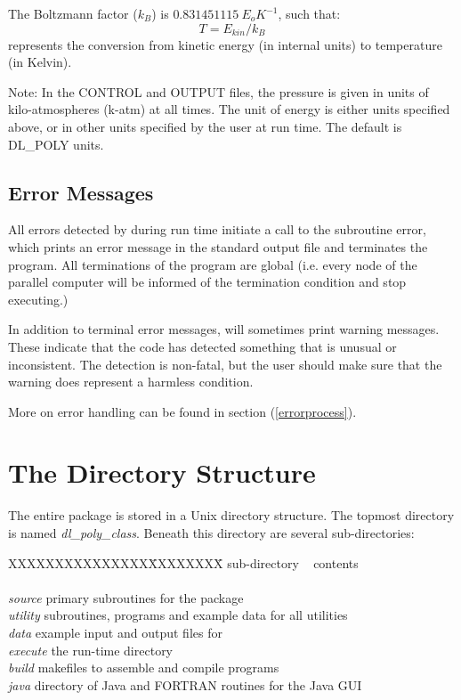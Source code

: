 \noindent The Boltzmann factor ($k_{B}$) is $0.831451115~E_{o}K^{-1}$,
such that:
\[T=E_{kin}/k_{B}\]
represents the conversion from kinetic energy (in internal units) to
temperature (in Kelvin).

Note: In the \D{} CONTROL and OUTPUT files, the
pressure is given in units of kilo-atmospheres
(k-atm) at all times. The unit of energy is either \D{} units specified above,
or in other units specified by the user at run time. The default is
DL\_POLY units.

\subsection{Error Messages}

All errors detected by \D{} during run time initiate a call
to the subroutine {\sc error}, which prints an error message in the
standard output file and terminates the program.  All
terminations of the program are global (i.e. every node of the
parallel computer will be informed of the termination condition and
stop executing.)

In addition to terminal error messages, \D{} will sometimes
print warning messages. These indicate that the code has detected
something that is unusual or inconsistent. The detection is non-fatal,
but the user should make sure that the warning does represent a
harmless condition.

More on error handling can be found in section (\ref{errorprocess}).

\section{The \D{} Directory Structure}
\label{directory}

The entire \D{} package is stored in a Unix directory structure.  The
topmost directory is named {\em dl\_poly\_class}.
Beneath this directory are several sub-directories:
\begin{tabbing}
XXXXXXXXXXXXXXX\=XXXXXXXX\= \kill
sub-directory\> ~ \> contents \\
\> \> \\
{\em source} \> primary subroutines for the \D{} package\\
{\em utility} \> subroutines, programs and example data for all utilities \\
{\em data} \> example input and output files for \D{} \\
{\em execute} \> the \D{} run-time directory \\
{\em build} \> makefiles to assemble and compile \D{} programs \\
{\em java} \> directory of Java and FORTRAN routines for the Java GUI \\
\end{tabbing}

